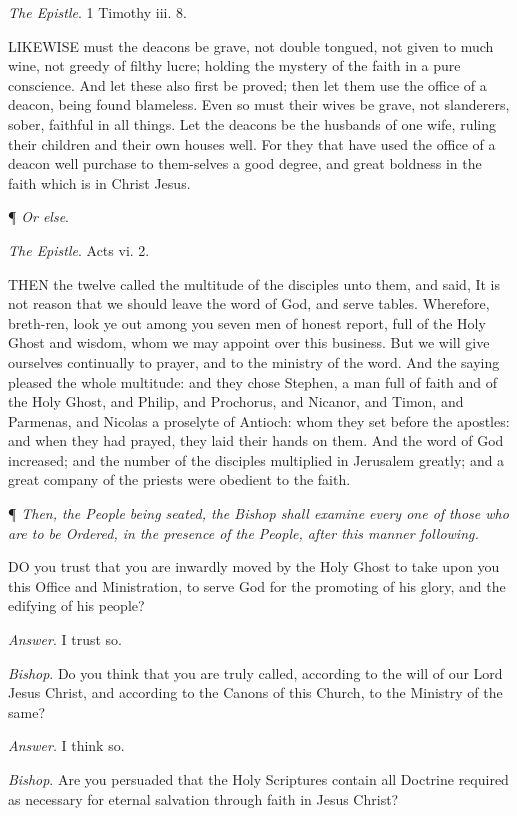 \emph{The
Epistle}. 1 Timothy iii. 8.

LIKEWISE
must the deacons be grave, not double tongued, not given to much wine,
not greedy of filthy lucre; holding the mystery of the faith in a pure
conscience. And let these also first be proved; then let them use the
office of a deacon, being found blameless. Even so must their wives be
grave, not slanderers, sober, faithful in all things. Let the deacons
be the husbands of one wife, ruling their children and their own houses
well. For they that have used the office of a deacon well purchase to
them-selves a good degree, and great boldness in the faith which is in
Christ Jesus.

¶
\emph{Or else}.

\emph{The
Epistle}. Acts vi. 2.

THEN
the twelve called the multitude of the disciples unto them, and said,
It is not reason that we should leave the word of God, and serve tables.
Wherefore, breth-ren, look ye out among you seven men of honest report,
full of the Holy Ghost and wisdom, whom we may appoint over this business.
But we will give ourselves continually to prayer, and to the ministry
of the word. And the saying pleased the whole multitude: and they chose
Stephen, a man full of faith and of the Holy Ghost, and Philip, and Prochorus,
and Nicanor, and Timon, and Parmenas, and Nicolas a proselyte of Antioch:
whom they set before the apostles: and when they had prayed, they laid
their hands on them. And the word of God increased; and the number of
the disciples multiplied in Jerusalem greatly; and a great company of
the priests were obedient to the faith.

¶
\emph{Then, the People being seated, the Bishop shall examine every one
of those who are to be Ordered, in the presence of the People, after this
manner following.}

DO
you trust that you are inwardly moved by the Holy Ghost to take upon you
this Office and Ministration, to serve God for the promoting of his glory,
and the edifying of his people?

\emph{Answer}. I trust so.

\emph{Bishop}. Do you think that you are truly called,
according to the will of our Lord Jesus Christ, and according to the Canons
of this Church, to the Ministry of the same?

\emph{Answer}. I think so.

\emph{Bishop}. Are you persuaded that the Holy
Scriptures contain all Doctrine required as necessary for eternal salvation
through faith in Jesus Christ?


